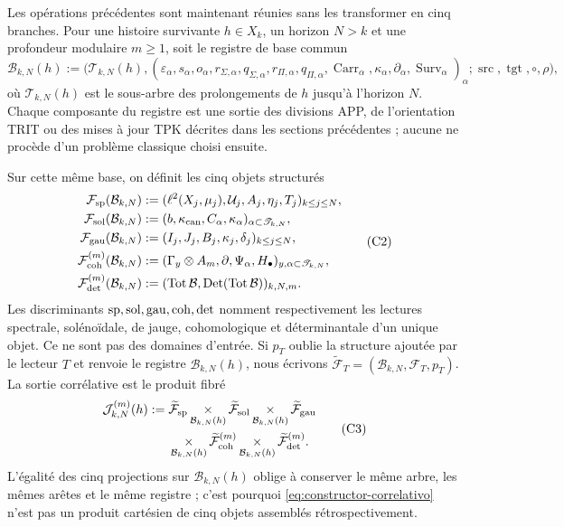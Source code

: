 Les opérations précédentes sont maintenant réunies sans les transformer en cinq branches. Pour une histoire survivante \(h\in X_k\), un horizon \(N>k\) et une profondeur modulaire \(m\geq1\), soit le registre de base commun
\[
 \mathcal B_{k,N}(h):=
 \bigl(\mathscr T_{k,N}(h),
       (\varepsilon_\alpha,s_\alpha,o_\alpha,
        r_{\Sigma,\alpha},q_{\Sigma,\alpha},
        r_{\Pi,\alpha},q_{\Pi,\alpha},
        \operatorname{Carr}_\alpha,
        \kappa_\alpha,\partial_\alpha,
        \operatorname{Surv}_\alpha)_\alpha;
       \operatorname{src},\operatorname{tgt},\circ,\rho\bigr),
 \tag{C1}
 \label{eq:base-comun-registros}
\]
où \(\mathscr T_{k,N}(h)\) est le sous-arbre des prolongements de \(h\)
jusqu'à l'horizon \(N\). Chaque composante du registre est une sortie des
divisions APP, de l'orientation TRIT ou des mises à jour TPK décrites
dans les sections précédentes ; aucune ne procède d'un problème classique choisi
ensuite.

Sur cette même base, on définit les cinq objets structurés
\[
\begin{aligned}
 \mathcal F_{\rm sp}(\mathcal B_{k,N})
   &:=(\ell^2(X_j,\mu_j),\mathcal U_j,A_j,\eta_j,T_j)_{k\leq j\leq N},\\
 \mathcal F_{\rm sol}(\mathcal B_{k,N})
   &:=(b,\kappa_{\rm can},C_\alpha,\kappa_\alpha)_{\alpha\subset\mathscr T_{k,N}},\\
 \mathcal F_{\rm gau}(\mathcal B_{k,N})
   &:=(I_j,J_j,B_j,\kappa_j,\delta_j)_{k\leq j\leq N},\\
 \mathcal F_{\rm coh}^{(m)}(\mathcal B_{k,N})
   &:=(\Gamma_y\otimes A_m,\partial,\Psi_\alpha,H_\bullet)_{y,\alpha\subset\mathscr T_{k,N}},\\
 \mathcal F_{\rm det}^{(m)}(\mathcal B_{k,N})
   &:=(\operatorname{Tot}\mathcal B,\operatorname{Det}(\operatorname{Tot}\mathcal B))_{k,N,m}.
\end{aligned}
 \tag{C2}
\]
Les discriminants \({\rm sp},{\rm sol},{\rm gau},{\rm coh},{\rm det}\) nomment respectivement les lectures spectrale, solénoïdale, de jauge, cohomologique et déterminantale d'un unique objet. Ce ne sont pas des domaines d'entrée. Si \(p_T\) oublie la structure ajoutée par le lecteur \(T\) et renvoie le registre \(\mathcal B_{k,N}(h)\), nous écrivons \(\widetilde{\mathcal F}_T=(\mathcal B_{k,N},\mathcal F_T,p_T)\). La sortie corrélative est le produit fibré
\[
\begin{aligned}
 \mathcal J_{k,N}^{(m)}(h):={}&
 \widetilde{\mathcal F}_{\rm sp}
 \mathop{\times}_{\mathcal B_{k,N}(h)}
 \widetilde{\mathcal F}_{\rm sol}
 \mathop{\times}_{\mathcal B_{k,N}(h)}
 \widetilde{\mathcal F}_{\rm gau}\\
 &\mathop{\times}_{\mathcal B_{k,N}(h)}
 \widetilde{\mathcal F}_{\rm coh}^{(m)}
 \mathop{\times}_{\mathcal B_{k,N}(h)}
 \widetilde{\mathcal F}_{\rm det}^{(m)}.
\end{aligned}
 \tag{C3}
 \label{eq:constructor-correlativo}
\]
L'égalité des cinq projections sur \(\mathcal B_{k,N}(h)\) oblige à
conserver le même arbre, les mêmes arêtes et le même registre ; c'est pourquoi
\eqref{eq:constructor-correlativo} n'est pas un produit cartésien de cinq
objets assemblés rétrospectivement.

